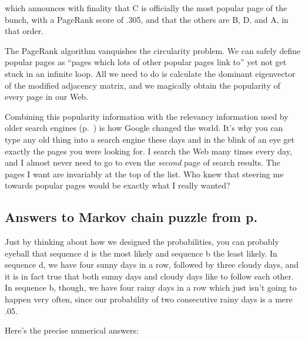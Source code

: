 \begin{alttitles}
which announces with finality that C is officially the most popular page of the
bunch, with a PageRank score of .305, and that the others are B, D, and A, in
that order.

The PageRank algorithm vanquishes the circularity problem. We can safely define
popular pages as ``pages which lots of other popular pages link to'' yet not
get stuck in an infinite loop. All we need to do is calculate the dominant
eigenvector of the modified adjacency matrix, and we magically obtain the
popularity of every page in our Web.

Combining this popularity information with the relevancy information used by
older search engines (p.~\pageref{sec:webSearchPreGoogle}) is how Google
changed the world. It's why you can type any old thing into a search engine
these days and in the blink of an eye get exactly the pages you were looking
for. I search the Web many times every day, and I almost never need to go to
even the \textit{second} page of search results. The pages I want are
invariably at the top of the list. Who knew that steering me towards popular
pages would be exactly what I really wanted?


\vfill
\pagebreak

\subsection*{Answers to Markov chain puzzle from
p.~\pageref{markovPuzzle}}

Just by thinking about how we designed the probabilities, you can probably
eyeball that sequence d is the most likely and sequence b the least likely. In
sequence d, we have four sunny days in a row, followed by three cloudy days,
and it is in fact true that both sunny days and cloudy days like to follow each
other. In sequence b, though, we have four rainy days in a row which just
isn't going to happen very often, since our probability of two consecutive
rainy days is a mere .05.

Here's the precise numerical answers:


\end{alttitles}
